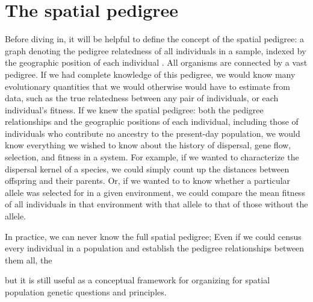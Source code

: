 \documentclass{ar-1col}
\begin{document}
\section{The spatial pedigree}
Before diving in, 
it will be helpful to define the concept of the spatial pedigree: 
a graph denoting the pedigree relatedness of all individuals in a sample, 
indexed by the geographic position of each individual .
All organisms are connected by a vast pedigree. 
If we had complete knowledge of this pedigree, 
we would know many evolutionary quantities 
that we would otherwise would have to estimate from data, 
such as the true relatedness between any pair of individuals, 
or each individual's fitness.
If we knew the spatial pedigree:
both the pedigree relationships 
and the geographic positions of each individual, 
including those of individuals 
who contribute no ancestry to the present-day population, 
we would know everything we wished to know about 
the history of dispersal, gene flow, 
selection, and fitness in a system.
For example, if we wanted to characterize the dispersal kernel of a species, 
we could simply count up the distances between offspring and their parents.
Or, if we wanted to to know whether a particular allele 
was selected for in a given environment, 
we could compare the mean fitness of all individuals in that environment with that allele 
to that of those without the allele.

In practice, we can never know the full spatial pedigree;
Even if we could census every individual in a population 
and establish the pedigree relationships between them all, 
the 


but it is still useful as a conceptual framework 
for organizing for spatial population genetic questions and principles.
\end{document}

